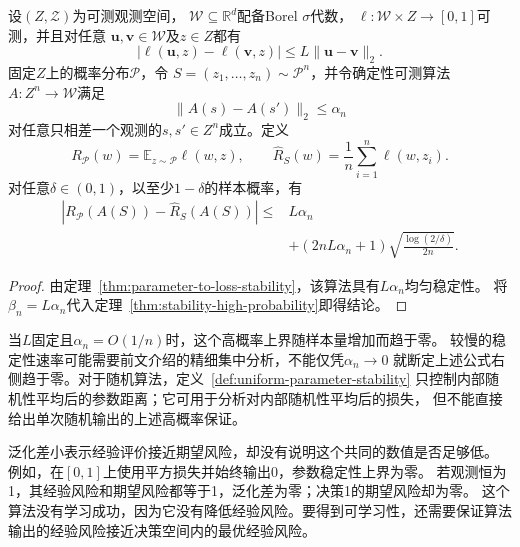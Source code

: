 \begin{theorem}[均匀参数稳定性的高概率泛化界]
\label{thm:parameter-high-probability}
设$(Z,\mathcal Z)$为可测观测空间，
$\mathcal W\subseteq\mathbb R^d$配备Borel $\sigma$代数，
$\ell:\mathcal W\times Z\to[0,1]$可测，并且对任意
$\bm u,\bm v\in\mathcal W$及$z\in Z$都有
\[
 |\ell(\bm u,z)-\ell(\bm v,z)|
 \leq L\|\bm u-\bm v\|_2.
\]
固定$Z$上的概率分布$\mathcal P$，令
$S=(z_1,\ldots,z_n)\sim\mathcal P^n$，并令确定性可测算法
$A:Z^n\to\mathcal W$满足
\[
 \|A(s)-A(s')\|_2\leq\alpha_n
\]
对任意只相差一个观测的$s,s'\in Z^n$成立。定义
\[
 R_{\mathcal P}(w)=\mathbb E_{z\sim\mathcal P}\ell(w,z),
 \qquad
 \hat R_S(w)=\frac1n\sum_{i=1}^n\ell(w,z_i).
\]
对任意$\delta\in(0,1)$，以至少$1-\delta$的样本概率，有
\begin{align*}
 |R_{\mathcal P}(A(S))-\hat R_S(A(S))|
 \leq{}&L\alpha_n\\
 &+(2nL\alpha_n+1)\sqrt{\frac{\log(2/\delta)}{2n}}.
\end{align*}
\end{theorem}
\begin{proof}
由定理~\ref{thm:parameter-to-loss-stability}，该算法具有$L\alpha_n$均匀稳定性。
将$\beta_n=L\alpha_n$代入定理~\ref{thm:stability-high-probability}即得结论。
\end{proof}

当$L$固定且$\alpha_n=O(1/n)$时，这个高概率上界随样本量增加而趋于零。
较慢的稳定性速率可能需要前文介绍的精细集中分析，不能仅凭$\alpha_n\to0$
就断定上述公式右侧趋于零。对于随机算法，定义~\ref{def:uniform-parameter-stability}
只控制内部随机性平均后的参数距离；它可用于分析对内部随机性平均后的损失，
但不能直接给出单次随机输出的上述高概率保证。

泛化差小表示经验评价接近期望风险，却没有说明这个共同的数值是否足够低。
例如，在$[0,1]$上使用平方损失并始终输出0，参数稳定性上界为零。
若观测恒为1，其经验风险和期望风险都等于1，泛化差为零；决策1的期望风险却为零。
这个算法没有学习成功，因为它没有降低经验风险。要得到可学习性，还需要保证算法
输出的经验风险接近决策空间内的最优经验风险。


